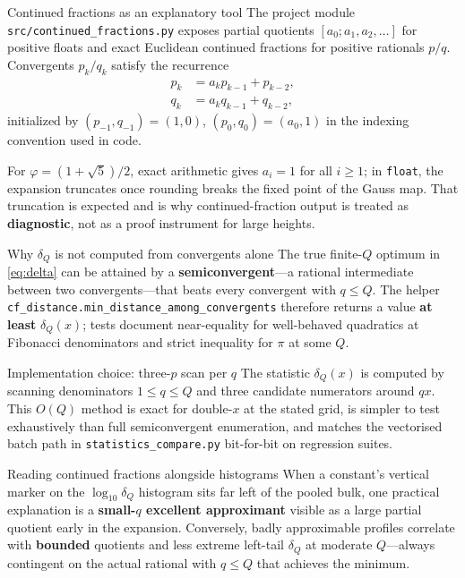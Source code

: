 \documentclass[
  ignorenonframetext,
]{beamer}
\author{\texorpdfstring{}{}}
\date{}
\begin{document}
\begin{frame}[fragile]{Continued fractions as an explanatory tool}
\protect{}\label{continued-fractions-as-an-explanatory-tool}
The project module \texttt{src/continued\_fractions.py} exposes partial
quotients \([a_0; a_1, a_2, \ldots]\) for positive floats and exact
Euclidean continued fractions for positive rationals \(p/q\).
Convergents \(p_k/q_k\) satisfy the recurrence \begin{align}
p_k &= a_k p_{k-1} + p_{k-2}, \\
q_k &= a_k q_{k-1} + q_{k-2},
\end{align} initialized by \((p_{-1},q_{-1})=(1,0)\),
\((p_0,q_0)=(a_0,1)\) in the indexing convention used in code.

For \(\varphi = (1+\sqrt{5})/2\), exact arithmetic gives \(a_i=1\) for
all \(i \geq 1\); in \texttt{float}, the expansion truncates once
rounding breaks the fixed point of the Gauss map. That truncation is
expected and is why continued-fraction output is treated as
\textbf{diagnostic}, not as a proof instrument for large heights.

\begin{block}{Why \(\delta_Q\) is not computed from convergents alone}
\protect{}\label{why-delta_q-is-not-computed-from-convergents-alone}
The true finite-\(Q\) optimum in \eqref{eq:delta} can be attained by a
\textbf{semiconvergent}---a rational intermediate between two
convergents---that beats every convergent with \(q\leq Q\). The helper
\texttt{cf\_distance.min\_distance\_among\_convergents} therefore
returns a value \textbf{at least} \(\delta_Q(x)\); tests document
near-equality for well-behaved quadratics at Fibonacci denominators and
strict inequality for \(\pi\) at some \(Q\).
\end{block}

\begin{block}{Implementation choice: three-\(p\) scan per \(q\)}
\protect{}\label{implementation-choice-three-p-scan-per-q}
The statistic \(\delta_Q(x)\) is computed by scanning denominators
\(1 \leq q \leq Q\) and three candidate numerators around \(qx\). This
\(O(Q)\) method is exact for double-\(x\) at the stated grid, is simpler
to test exhaustively than full semiconvergent enumeration, and matches
the vectorised batch path in \texttt{statistics\_compare.py} bit-for-bit
on regression suites.
\end{block}

\begin{block}{Reading continued fractions alongside histograms}
\protect{}\label{reading-continued-fractions-alongside-histograms}
When a constant's vertical marker on the \(\log_{10}\delta_Q\) histogram
sits far left of the pooled bulk, one practical explanation is a
\textbf{small-\(q\) excellent approximant} visible as a large partial
quotient early in the expansion. Conversely, badly approximable profiles
correlate with \textbf{bounded} quotients and less extreme left-tail
\(\delta_Q\) at moderate \(Q\)---always contingent on the actual
rational with \(q\leq Q\) that achieves the minimum.
\end{block}
\end{frame}
\end{document}
